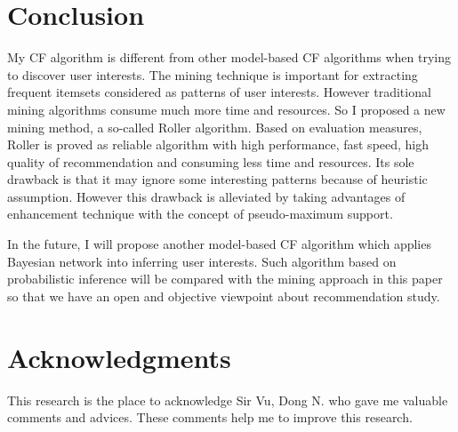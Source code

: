 \documentclass{sig-alternate}
\begin{document}
\section{Conclusion} \label{section:conclusion}
My CF algorithm is different from other model-based CF algorithms when trying to discover user interests. The mining technique is important for extracting frequent itemsets considered as patterns of user interests. However traditional mining algorithms consume much more time and resources. So I proposed a new mining method, a so-called Roller algorithm. Based on evaluation measures, Roller is proved as reliable algorithm with high performance, fast speed, high quality of recommendation and consuming less time and resources. Its sole drawback is that it may ignore some interesting patterns because of heuristic assumption. However this drawback is alleviated by taking advantages of enhancement technique with the concept of pseudo-maximum support.

In the future, I will propose another model-based CF algorithm which applies Bayesian network into inferring user interests. Such algorithm based on probabilistic inference will be compared with the mining approach in this paper so that we have an open and objective viewpoint about recommendation study.

\section{Acknowledgments}
This research is the place to acknowledge Sir Vu, Dong N. who gave me valuable comments and advices. These comments help me to improve this research.

%

%
\end{document}

